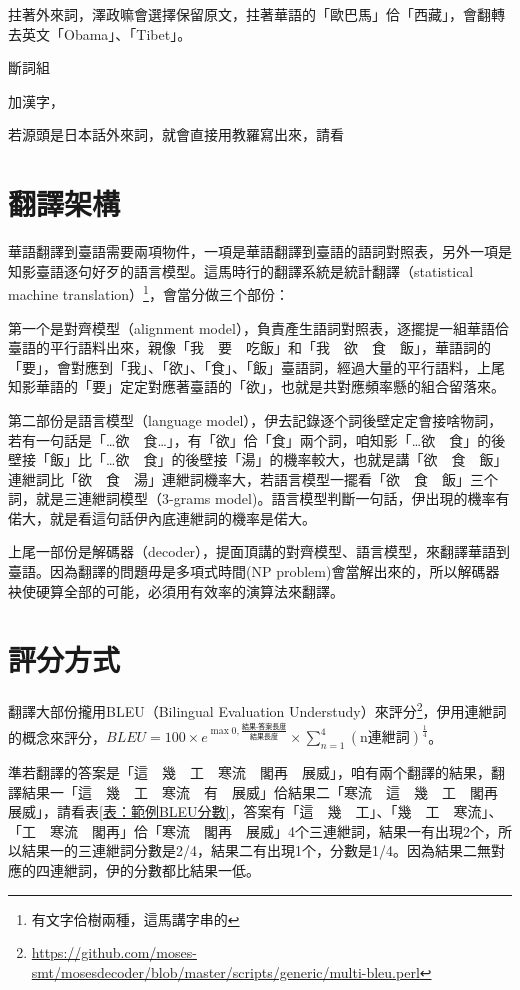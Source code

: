 \documentclass[final,oneside,onecolumn,12pt,a4paper]{book}%
\begin{document}
拄著外來詞，澤政嘛會選擇保留原文，拄著華語的「歐巴馬」佮「西藏」，會翻轉去英文「Obama」、「Tibet」。

斷詞組

加漢字，

若源頭是日本話外來詞，就會直接用教羅寫出來，請看

\section{翻譯架構}
\label{節：翻譯架構}
華語翻譯到臺語需要兩項物件，一項是華語翻譯到臺語的語詞對照表，另外一項是知影臺語逐句好歹的語言模型。這馬時行的翻譯系統是統計翻譯（statistical machine translation）\footnote{有文字佮樹兩種，這馬講字串的}，會當分做三个部份：

第一个是對齊模型（alignment model），負責產生語詞對照表，逐擺提一組華語佮臺語的平行語料出來，親像「我　要　吃飯」和「我　欲　食　飯」，華語詞的「要」，會對應到「我」、「欲」、「食」、「飯」臺語詞，經過大量的平行語料，上尾知影華語的「要」定定對應著臺語的「欲」，也就是共對應頻率懸的組合留落來。

第二部份是語言模型（language model），伊去記錄逐个詞後壁定定會接啥物詞，若有一句話是「…欲　食…」，有「欲」佮「食」兩个詞，咱知影「…欲　食」的後壁接「飯」比「…欲　食」的後壁接「湯」的機率較大，也就是講「欲　食　飯」連紲詞比「欲　食　湯」連紲詞機率大，若語言模型一擺看「欲　食　飯」三个詞，就是三連紲詞模型（3-grams model)。語言模型判斷一句話，伊出現的機率有偌大，就是看這句話伊內底連紲詞的機率是偌大。

上尾一部份是解碼器（decoder），提面頂講的對齊模型、語言模型，來翻譯華語到臺語。因為翻譯的問題毋是多項式時間(NP problem)會當解出來的，所以解碼器袂使硬算全部的可能，必須用有效率的演算法來翻譯。

\section{評分方式}
\label{節：評分方式}

翻譯大部份攏用BLEU（Bilingual Evaluation Understudy）來評分\footnote{\url{https://github.com/moses-smt/mosesdecoder/blob/master/scripts/generic/multi-bleu.perl}}，伊用連紲詞的概念來評分，$BLEU=100\times{e^{\max{0,\frac{\textit{結果-答案長度}}{\textit{結果長度}}}}}\times{\sum_{n=1}^{4}(\textrm{n連紲詞})^{\frac{1}{4}}}$。

準若翻譯的答案是「這　幾　工　寒流　閣再　展威」，咱有兩个翻譯的結果，翻譯結果一「這　幾　工　寒流　有　展威」佮結果二「寒流　這　幾　工　閣再　展威」，請看表\ref{表：範例BLEU分數}，答案有「這　幾　工」、「幾　工　寒流」、「工　寒流　閣再」佮「寒流　閣再　展威」4个三連紲詞，結果一有出現2个，所以結果一的三連紲詞分數是2/4，結果二有出現1个，分數是1/4。因為結果二無對應的四連紲詞，伊的分數都比結果一低。
\end{document}
